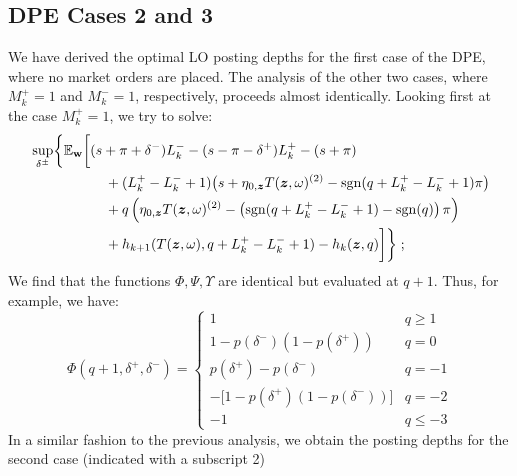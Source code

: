 \subsection{DPE Cases 2 and 3}
We have derived the optimal LO posting depths for the first case of the DPE, where no market orders are placed. The analysis of the other two cases, where $M_k^+ = 1$ and $M_k^- = 1$, respectively, proceeds almost identically. Looking first at the case $M_k^+ = 1$, we try to solve:
\begin{equation}
\label{eq:discretesup2}
\begin{split}
& \sup_{\delta^\pm} \biggl\lbrace \E_{\bw} \biggl[
(s + \pi + \delta^-)L_k^- - (s - \pi - \delta^+)L_k^+ - (s + \pi)\\
& \hphantom{\sup_{\bu} \biggl\lbrace \E_{\bw} \biggl[ {}+{}} + (L_k^+ - L_k^- +1) \bigl( s + \eta_{0,\bz} T(\bz, \omega)^{(2)}  -\sgn( q + L_k^+ - L_k^- +1)\pi   \bigr) \\
& \hphantom{\sup_{\bu} \biggl\lbrace \E_{\bw} \biggl[ {}+{}} + q\left( \eta_{0,\bz} T(\bz, \omega)^{(2)}  -\left( \sgn( q + L_k^+ - L_k^- +1) - \sgn(q) \right) \pi \right) \\
& \hphantom{\sup_{\bu} \biggl\lbrace \E_{\bw} \biggl[ {}+{}} + h_{k+1}(T(\bz,\omega), q + L_k^+ - L_k^- + 1) -  h_k(\bz,q) \biggr] \biggr\rbrace \; ; \\
\end{split}
\end{equation}
We find that the functions $\Phi, \Psi, \Upsilon$ are identical but evaluated at $q+1$. Thus, for example, we have:
\begin{equation}
\label{eq:discretephioffset}
\Phi(q+1, \delta^+, \delta^-) = \begin{cases} 
1 & q \geq 1 \\
1 - p(\delta^-)(1 - p(\delta^+)) & q = 0 \\
p(\delta^+) - p(\delta^-) & q = -1 \\
-\bigl[ 1 - p(\delta^+)(1 - p(\delta^-)) \bigr] & q = -2 \\
-1 & q \leq -3
\end{cases}
\end{equation}
In a similar fashion to the previous analysis, we obtain the posting depths for the second case (indicated with a subscript 2)
